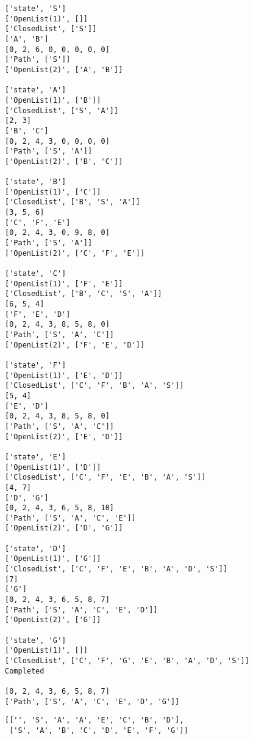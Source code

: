 \documentclass[11pt]{article}
\makeatletter
\newcommand{\boxspacing}{\kern\kvtcb@left@rule\kern\kvtcb@boxsep}
\newcommand{\prompt}[4]{
        {\ttfamily\llap{{\color{#2}[#3]:\hspace{3pt}#4}}\vspace{-\baselineskip}}
    }
\makeatother
\begin{document}
    \begin{Verbatim}[commandchars=\\\{\}]
['state', 'S']
['OpenList(1)', []]
['ClosedList', ['S']]
['A', 'B']
[0, 2, 6, 0, 0, 0, 0, 0]
['Path', ['S']]
['OpenList(2)', ['A', 'B']]

['state', 'A']
['OpenList(1)', ['B']]
['ClosedList', ['S', 'A']]
[2, 3]
['B', 'C']
[0, 2, 4, 3, 0, 0, 0, 0]
['Path', ['S', 'A']]
['OpenList(2)', ['B', 'C']]

['state', 'B']
['OpenList(1)', ['C']]
['ClosedList', ['B', 'S', 'A']]
[3, 5, 6]
['C', 'F', 'E']
[0, 2, 4, 3, 0, 9, 8, 0]
['Path', ['S', 'A']]
['OpenList(2)', ['C', 'F', 'E']]

['state', 'C']
['OpenList(1)', ['F', 'E']]
['ClosedList', ['B', 'C', 'S', 'A']]
[6, 5, 4]
['F', 'E', 'D']
[0, 2, 4, 3, 8, 5, 8, 0]
['Path', ['S', 'A', 'C']]
['OpenList(2)', ['F', 'E', 'D']]

['state', 'F']
['OpenList(1)', ['E', 'D']]
['ClosedList', ['C', 'F', 'B', 'A', 'S']]
[5, 4]
['E', 'D']
[0, 2, 4, 3, 8, 5, 8, 0]
['Path', ['S', 'A', 'C']]
['OpenList(2)', ['E', 'D']]

['state', 'E']
['OpenList(1)', ['D']]
['ClosedList', ['C', 'F', 'E', 'B', 'A', 'S']]
[4, 7]
['D', 'G']
[0, 2, 4, 3, 6, 5, 8, 10]
['Path', ['S', 'A', 'C', 'E']]
['OpenList(2)', ['D', 'G']]

['state', 'D']
['OpenList(1)', ['G']]
['ClosedList', ['C', 'F', 'E', 'B', 'A', 'D', 'S']]
[7]
['G']
[0, 2, 4, 3, 6, 5, 8, 7]
['Path', ['S', 'A', 'C', 'E', 'D']]
['OpenList(2)', ['G']]

['state', 'G']
['OpenList(1)', []]
['ClosedList', ['C', 'F', 'G', 'E', 'B', 'A', 'D', 'S']]
Completed

[0, 2, 4, 3, 6, 5, 8, 7]
['Path', ['S', 'A', 'C', 'E', 'D', 'G']]
    \end{Verbatim}

            \begin{tcolorbox}[breakable, size=fbox, boxrule=.5pt, pad at break*=1mm, opacityfill=0]
\prompt{Out}{outcolor}{99}{\boxspacing}
\begin{Verbatim}[commandchars=\\\{\}]
[['', 'S', 'A', 'A', 'E', 'C', 'B', 'D'],
 ['S', 'A', 'B', 'C', 'D', 'E', 'F', 'G']]
\end{Verbatim}
\end{tcolorbox}
        

    
    
    
\end{document}
